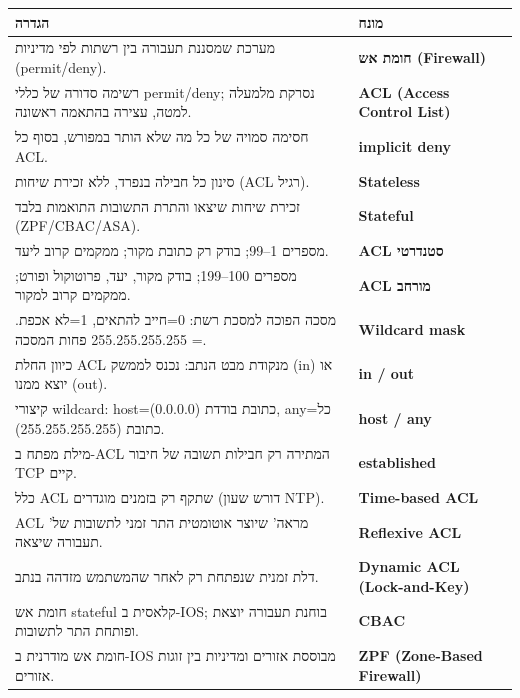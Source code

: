 \documentclass[11pt]{article}
\newcommand{\enLR}[1]{\textenglish{#1}}
\begin{document}
\begin{xltabular}{\linewidth}{|>{\setRTL\raggedleft\arraybackslash}X|>{\setRTL\raggedleft\arraybackslash}X|}
\hline
{}\textbf{הגדרה} & \textbf{מונח} \\
\hline
\endhead
מערכת שמסננת תעבורה בין רשתות לפי מדיניות \enLR{(permit/deny).} & \textbf{חומת אש \enLR{(Firewall)}} \\
\hline
רשימה סדורה של כללי \enLR{permit/deny}; נסרקת מלמעלה למטה, עצירה בהתאמה ראשונה. & \textbf{\enLR{ACL (Access Control List)}} \\
\hline
חסימה סמויה של כל מה שלא הותר במפורש, בסוף כל \enLR{ACL.} & \textbf{\enLR{implicit deny}} \\
\hline
סינון כל חבילה בנפרד, ללא זכירת שיחות \enLR{(ACL} רגיל). & \textbf{\enLR{Stateless}} \\
\hline
זכירת שיחות שיצאו והתרת התשובות התואמות בלבד \enLR{(ZPF/CBAC/ASA).} & \textbf{\enLR{Stateful}} \\
\hline
מספרים \enLR{1}–\enLR{99}; בודק רק כתובת מקור; ממקמים קרוב ליעד. & \textbf{\enLR{ACL} סטנדרטי} \\
\hline
מספרים \enLR{100}–\enLR{199}; בודק מקור, יעד, פרוטוקול ופורט; ממקמים קרוב למקור. & \textbf{\enLR{ACL} מורחב} \\
\hline
מסכה הפוכה למסכת רשת: \enLR{0}=חייב להתאים, \enLR{1}=לא אכפת. = \enLR{255.255.255.255} פחות המסכה. & \textbf{\enLR{Wildcard mask}} \\
\hline
כיוון החלת \enLR{ACL} מנקודת מבט הנתב: נכנס לממשק \enLR{(in)} או יוצא ממנו \enLR{(out).} & \textbf{\enLR{in / out}} \\
\hline
קיצורי \enLR{wildcard: host}=כתובת בודדת \enLR{(0.0.0.0), any}=כל כתובת \enLR{(255.255.255.255).} & \textbf{\enLR{host / any}} \\
\hline
מילת מפתח ב-\enLR{ACL} המתירה רק חבילות תשובה של חיבור \enLR{TCP} קיים. & \textbf{\enLR{established}} \\
\hline
כלל \enLR{ACL} שתקף רק בזמנים מוגדרים (דורש שעון \enLR{NTP).} & \textbf{\enLR{Time-based ACL}} \\
\hline
\enLR{ACL '}מראה' שיוצר אוטומטית התר זמני לתשובות של תעבורה שיצאה. & \textbf{\enLR{Reflexive ACL}} \\
\hline
דלת זמנית שנפתחת רק לאחר שהמשתמש מזדהה בנתב. & \textbf{\enLR{Dynamic ACL (Lock-and-Key)}} \\
\hline
חומת אש \enLR{stateful} קלאסית ב-\enLR{IOS}; בוחנת תעבורה יוצאת ופותחת התר לתשובות. & \textbf{\enLR{CBAC}} \\
\hline
חומת אש מודרנית ב-\enLR{IOS} מבוססת אזורים ומדיניות בין זוגות אזורים. & \textbf{\enLR{ZPF (Zone-Based Firewall)}} \\

\end{xltabular}
\end{document}
